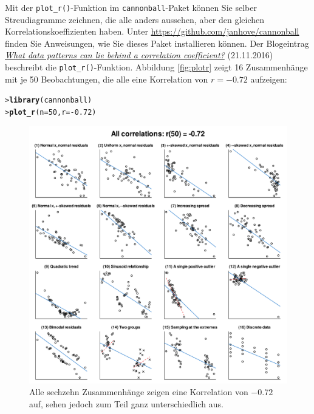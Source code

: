 \documentclass[oneside, 10pt]{book}\usepackage[]{graphicx}\usepackage[]{xcolor}
\makeatletter
\newcommand{\hlnum}[1]{\textcolor[rgb]{0.686,0.059,0.569}{#1}}%
\newcommand{\hlopt}[1]{\textcolor[rgb]{0,0,0}{#1}}%
\newcommand{\hlstd}[1]{\textcolor[rgb]{0.345,0.345,0.345}{#1}}%
\newcommand{\hlkwc}[1]{\textcolor[rgb]{0.333,0.667,0.333}{#1}}%
\newcommand{\hlkwd}[1]{\textcolor[rgb]{0.737,0.353,0.396}{\textbf{#1}}}%
\newenvironment{kframe}{%
 \def\at@end@of@kframe{}%
 \ifinner\ifhmode%
  \def\at@end@of@kframe{\end{minipage}}%
  \begin{minipage}{\columnwidth}%
 \fi\fi%
 \def\FrameCommand##1{\hskip\@totalleftmargin \hskip-\fboxsep
 \colorbox{shadecolor}{##1}\hskip-\fboxsep
     \hskip-\linewidth \hskip-\@totalleftmargin \hskip\columnwidth}%
 \MakeFramed {\advance\hsize-\width
   \@totalleftmargin\z@ \linewidth\hsize
   \@setminipage}}%
 {\par\unskip\endMakeFramed%
 \at@end@of@kframe}
\newenvironment{knitrout}{}{} %
\makeatother
\begin{document}
Mit der \texttt{plot\_r()}-Funktion im \texttt{cannonball}-Paket
können Sie selber Streudiagramme zeichnen, die alle anders aussehen,
aber den gleichen Korrelationskoeffizienten haben.
Unter \url{https://github.com/janhove/cannonball} finden Sie
Anweisungen, wie Sie dieses Paket installieren können.
Der Blogeintrag \href{https://janhove.github.io/teaching/2016/11/21/what-correlations-look-like}{\textit{What data patterns can lie behind a correlation coefficient?}} (21.11.2016)
beschreibt die \texttt{plot\_r()}-Funktion.
Abbildung \ref{fig:plotr} zeigt 16 Zusammenhänge mit je 50 Beobachtungen, die
alle eine Korrelation von $r = -0.72$ aufzeigen:
\begin{knitrout}
\color{fgcolor}\begin{kframe}
\begin{alltt}
\hlstd{> }\hlkwd{library}\hlstd{(cannonball)}
\hlstd{> }\hlkwd{plot_r}\hlstd{(}\hlkwc{n} \hlstd{=} \hlnum{50}\hlstd{,} \hlkwc{r} \hlstd{=} \hlopt{-}\hlnum{0.72}\hlstd{)}
\end{alltt}
\end{kframe}\begin{figure}[tp]

{\centering \includegraphics[width=\textwidth]{figs/unnamed-chunk-184-1} 

}

\caption{Alle sechzehn Zusammenhänge zeigen eine Korrelation von $-0.72$ auf, sehen jedoch zum Teil ganz unterschiedlich aus.\label{fig:plotr}}\label{fig:unnamed-chunk-184}
\end{figure}

\end{knitrout}
\end{document}
